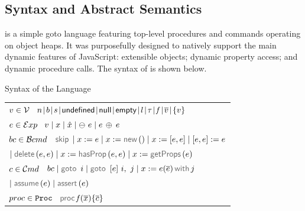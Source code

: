 \vspace*{-0.2cm}
\subsection{\jsil Syntax and Abstract Semantics}\label{subsec:jsil:analysis:formalism}

\vspace*{-0.1cm}
 \jsil is a simple goto language featuring top-level procedures and commands operating on object heaps. It was purposefully designed to natively support the main dynamic features of JavaScript: extensible objects; dynamic property access; and dynamic procedure calls. The syntax of \jsil is shown below. 

\vspace{5pt}
\begin{display}{Syntax of the \jsil Language}{
\begin{tabular}{l}
$v \in \mathcal{V}$ \ $\jnumber \! \mid \! \jbool \! \mid \! \jstring \! \mid \! {\small \jundefined} \! \mid \! {\small \jnull} \! \mid \! {\small \jempty} \! \mid \! \loc \! \mid \! \jtype \! \mid \!  \pid \! \mid \! \overline{\val} \! \mid \! \{ \val \}$
   \\[0.1cm]
  $e \in \mathcal{E}xp$ \ $v \mid x \mid \hat{x} \mid \ominus\ e \mid e \, \oplus_{} \, e$
 \\[0.1cm]
%
$bc \in \mathcal{B}cmd$ \ $\jsilskip \mid \jvar := \jsilexpr  \mid \jvar := \jsilnew() \mid \jvar := [\jsilexpr, \jsilexpr] \mid [\jsilexpr, \jsilexpr] := \jsilexpr $ \\
%
\hspace{0.02cm} $\mid \jsildelete(\jsilexpr, \jsilexpr) \mid \jvar := \hasfield(\jsilexpr, \jsilexpr) \mid \jvar := \getfields(\jsilexpr)$ \\[0.1cm]
$c \in \mathcal{C}md$  \ $ \bcmd \mid \goto \ i \mid  \ifgoto{\jsilexpr}{i}{j} \mid \jsilcall{\jvar}{\jsilexpr}{\jvec{\jsilexpr}}{j}$ \\
\hspace{0.02cm} $ \mid \assume(\jsilexpr) \mid \jassert(\jsilexpr)$ \\[0.1cm]
%
$proc \in \mathtt{Proc}$  \ $\procedure{\pid}{\jvec{\jvar}}{\jvec{\jcmd}}$
 \end{tabular}}
\end{display}

